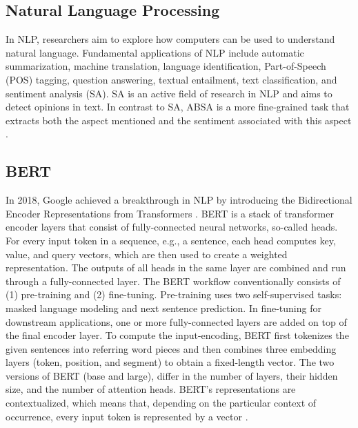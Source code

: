 \subsection{Natural Language Processing}
In NLP, researchers aim to explore how computers can be used to understand natural language. Fundamental applications of NLP include automatic summarization, machine translation, language identification, Part-of-Speech (POS) tagging, question answering, textual entailment, text classification, and sentiment analysis (SA). SA is an active field of research in NLP and aims to detect opinions in text. In contrast to SA, ABSA is a more fine-grained task that extracts both the aspect mentioned and the sentiment associated with this aspect \cite{pavlopoulos2014aspect}.

\subsection{BERT}
In 2018, Google achieved a breakthrough in NLP by introducing the Bidirectional Encoder Representations from Transformers \cite{devlin2018bert}. BERT is a stack of transformer encoder layers that consist of fully-connected neural networks, so-called heads. For every input token in a sequence, e.g., a sentence, each head computes key, value, and query vectors, which are then used to create a weighted representation. The outputs of all heads in the same layer are combined and run through a fully-connected layer.
The BERT workflow conventionally consists of (1) pre-training and (2) fine-tuning. Pre-training uses two self-supervised tasks: masked language modeling and next sentence prediction. In fine-tuning for downstream applications, one or more fully-connected layers are added on top of the final encoder layer. To compute the input-encoding, BERT first tokenizes the given sentences into referring word pieces and then combines three embedding layers (token, position, and segment) to obtain a fixed-length vector.
The two versions of BERT (base and large), differ in the number of layers, their hidden size, and the number of attention heads.  BERT's representations are contextualized, which means that, depending on the particular context of occurrence, every input token is represented by a vector \cite{Rogers2020API}.

